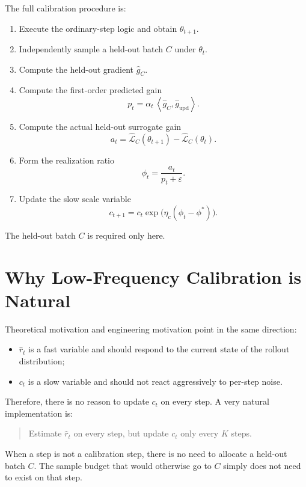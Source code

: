 \documentclass[11pt,a4paper]{article}
\newcommand{\ip}[2]{\left\langle #1,#2 \right\rangle}
\newcommand{\ghat}{\hat g}
\newcommand{\rhat}{\hat r_t}
\newcommand{\phit}{\phi_t}
\begin{document}
The full calibration procedure is:
\begin{enumerate}[label=\arabic*., leftmargin=2em]
    \item Execute the ordinary-step logic and obtain $\theta_{t+1}$.
    \item Independently sample a held-out batch $C$ under $\theta_t$.
    \item Compute the held-out gradient $\ghat_C$.
    \item Compute the first-order predicted gain
    \begin{equation*}
    p_t = \alpha_t \, \ip{\ghat_C}{\ghat_{\mathrm{upd}}}.
    \end{equation*}
    \item Compute the actual held-out surrogate gain
    \begin{equation*}
    a_t = \widehat{\mathcal L}_C(\theta_{t+1}) - \widehat{\mathcal L}_C(\theta_t).
    \end{equation*}
    \item Form the realization ratio
    \begin{equation*}
    \phit = \frac{a_t}{p_t + \varepsilon}.
    \end{equation*}
    \item Update the slow scale variable
    \begin{equation*}
    c_{t+1} = c_t \exp\!\bigl(\eta_c(\phit - \phi^{\ast})\bigr).
    \end{equation*}
\end{enumerate}
The held-out batch $C$ is required only here.

\section{Why Low-Frequency Calibration is Natural}
Theoretical motivation and engineering motivation point in the same direction:
\begin{itemize}[leftmargin=2em]
    \item $\rhat$ is a fast variable and should respond to the current state of the rollout distribution;
    \item $c_t$ is a slow variable and should not react aggressively to per-step noise.
\end{itemize}
Therefore, there is no reason to update $c_t$ on every step. A very natural implementation is:
\begin{quote}
Estimate $\rhat$ on every step, but update $c_t$ only every $K$ steps.
\end{quote}
When a step is not a calibration step, there is no need to allocate a held-out batch $C$. The sample budget that would otherwise go to $C$ simply does not need to exist on that step.
\end{document}
